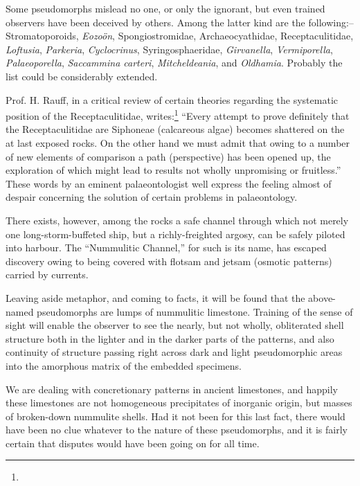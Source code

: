 \documentclass[a4paper, 12pt, oneside]{article}
\begin{document}
Some pseudomorphs mislead no one, or only the ignorant, but even trained observers have been deceived by others. Among the latter kind are the following:-- Stromatoporoids, \emph{Eozoön}, Spongiostromidae, Archaeocyathidae, Receptaculitidae, \emph{Loftusia}, \emph{Parkeria}, \emph{Cyclocrinus}, Syringosphaeridae, \emph{Girvanella}, \emph{Vermiporella}, \emph{Palaeoporella}, \emph{Saccammina carteri}, \emph{Mitcheldeania}, and \emph{Oldhamia}. Probably the list could be considerably extended.

Prof. H. Rauff, in a critical review of certain theories regarding the systematic position of the Receptaculitidae, writes:\footnote{} ``Every attempt to prove definitely that the Receptaculitidae are Siphoneae (calcareous algae) becomes shattered on the at last exposed rocks. On the other hand we must admit that owing to a number of new elements of comparison a path (perspective) has been opened up, the exploration of which might lead to results not wholly unpromising or fruitless.'' These words by an eminent palaeontologist well express the feeling almost of despair concerning the solution of certain problems in palaeontology.

There exists, however, among the rocks a safe channel through which not merely one long-storm-buffeted ship, but a richly-freighted argosy, can be safely piloted into harbour. The ``Nummulitic Channel,'' for such is its name, has escaped discovery owing to being covered with flotsam and jetsam (osmotic patterns) carried by currents.

Leaving aside metaphor, and coming to facts, it will be found that the above-named pseudomorphs are lumps of nummulitic limestone. Training of the sense of sight will enable the observer to see the nearly, but not wholly, obliterated shell structure both in the lighter and in the darker parts of the patterns, and also continuity of structure passing right across dark and light pseudomorphic areas into the amorphous matrix of the embedded specimens.

We are dealing with concretionary patterns in ancient limestones, and happily these limestones are not homogeneous precipitates of inorganic origin, but masses of broken-down nummulite shells. Had it not been for this last fact, there would have been no clue whatever to the nature of these pseudomorphs, and it is fairly certain that disputes would have been going on for all time.
\end{document}
